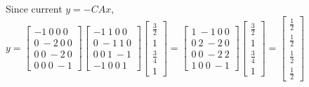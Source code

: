 \documentclass[11pt]{article}
\begin{document}
Since current \(y = -CAx\), \(y = \begin{bmatrix} -1 \ 0 \ 0 \ 0 \\ 0 \ -2 \ 0 \ 0 \\ 0 \ 0 \ -2 \ 0 \\ 0 \ 0 \ 0 \ -1 \end{bmatrix}\begin{bmatrix} -1 \ 1 \ 0 \ 0 \\ 0 \ -1 \ 1 \ 0 \\ 0 \ 0 \ 1 \ -1 \\ -1 \ 0 \ 0 \ 1 \end{bmatrix}\begin{bmatrix}\frac{3}{2} \\ 1 \\ \frac{3}{4} \\ 1 \end{bmatrix} = \begin{bmatrix} 1 \ -1 \ 0 \ 0 \\ 0 \ 2 \ -2 \ 0 \\ 0 \ 0 \ -2 \ 2 \\ 1 \ 0 \ 0 \ -1 \end{bmatrix}\begin{bmatrix}\frac{3}{2} \\ 1 \\ \frac{3}{4} \\ 1 \end{bmatrix} = \begin{bmatrix}\frac{1}{2} \\ \frac{1}{2} \\ \frac{1}{2} \\ \frac{1}{2} \end{bmatrix}\)
\end{document}
